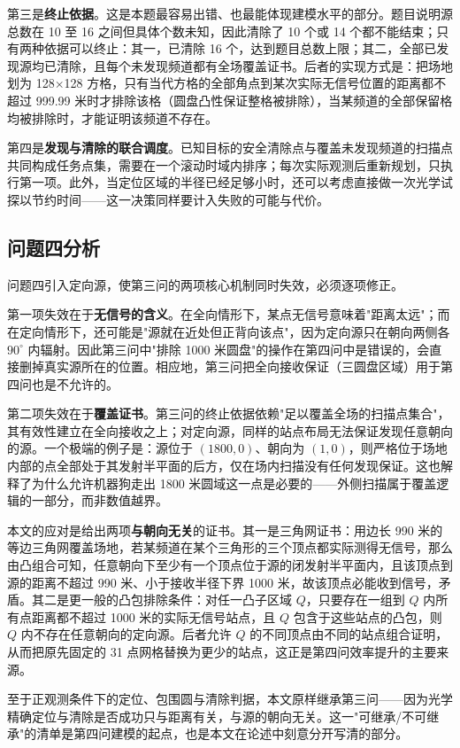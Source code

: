 第三是\textbf{终止依据}。这是本题最容易出错、也最能体现建模水平的部分。题目说明源总数在 10 至 16 之间但具体个数未知，因此清除了 10 个或 14 个都不能结束；只有两种依据可以终止：其一，已清除 16 个，达到题目总数上限；其二，全部已发现源均已清除，且每个未发现频道都有全场覆盖证书。后者的实现方式是：把场地划为 128$\times$128 方格，只有当代方格的全部角点到某次实际无信号位置的距离都不超过 999.99 米时才排除该格（圆盘凸性保证整格被排除），当某频道的全部保留格均被排除时，才能证明该频道不存在。

第四是\textbf{发现与清除的联合调度}。已知目标的安全清除点与覆盖未发现频道的扫描点共同构成任务点集，需要在一个滚动时域内排序；每次实际观测后重新规划，只执行第一项。此外，当定位区域的半径已经足够小时，还可以考虑直接做一次光学试探以节约时间——这一决策同样要计入失败的可能与代价。

\subsection{问题四分析}

问题四引入定向源，使第三问的两项核心机制同时失效，必须逐项修正。

第一项失效在于\textbf{无信号的含义}。在全向情形下，某点无信号意味着"距离太远"；而在定向情形下，还可能是"源就在近处但正背向该点"，因为定向源只在朝向两侧各 $90^\circ$ 内辐射。因此第三问中"排除 1000 米圆盘"的操作在第四问中是错误的，会直接删掉真实源所在的位置。相应地，第三问把全向接收保证（三圆盘区域）用于第四问也是不允许的。

第二项失效在于\textbf{覆盖证书}。第三问的终止依据依赖"足以覆盖全场的扫描点集合"，其有效性建立在全向接收之上；对定向源，同样的站点布局无法保证发现任意朝向的源。一个极端的例子是：源位于 $(1800,0)$、朝向为 $(1,0)$，则严格位于场地内部的点全部处于其发射半平面的后方，仅在场内扫描没有任何发现保证。这也解释了为什么允许机器狗走出 1800 米圆域这一点是必要的——外侧扫描属于覆盖逻辑的一部分，而非数值越界。

本文的应对是给出两项\textbf{与朝向无关}的证书。其一是三角网证书：用边长 990 米的等边三角网覆盖场地，若某频道在某个三角形的三个顶点都实际测得无信号，那么由凸组合可知，任意朝向下至少有一个顶点位于源的闭发射半平面内，且该顶点到源的距离不超过 990 米、小于接收半径下界 1000 米，故该顶点必能收到信号，矛盾。其二是更一般的凸包排除条件：对任一凸子区域 $Q$，只要存在一组到 $Q$ 内所有点距离都不超过 1000 米的实际无信号站点，且 $Q$ 包含于这些站点的凸包，则 $Q$ 内不存在任意朝向的定向源。后者允许 $Q$ 的不同顶点由不同的站点组合证明，从而把原先固定的 31 点网格替换为更少的站点，这正是第四问效率提升的主要来源。

至于正观测条件下的定位、包围圆与清除判据，本文原样继承第三问——因为光学精确定位与清除是否成功只与距离有关，与源的朝向无关。这一"可继承/不可继承"的清单是第四问建模的起点，也是本文在论述中刻意分开写清的部分。
